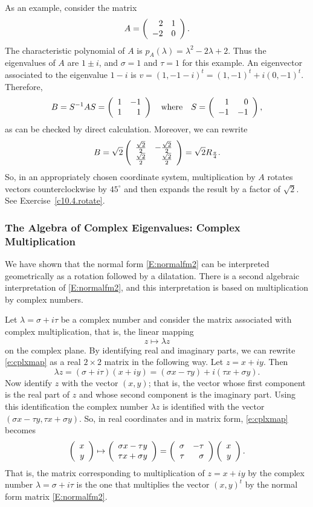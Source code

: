 \documentclass{ximera}
\begin{document}
As an example, consider the matrix
\begin{equation}  \label{E:exampA}
A = \left(\begin{array}{rr} 2 & 1\\ -2 &0\end{array}\right).
\end{equation}
The characteristic polynomial
of $A$ is $p_A(\lambda)=\lambda^2-2\lambda+2$.
Thus the eigenvalues of $A$ are $1\pm i$, and $\sigma=1$ and $\tau=1$ for
this example.  An eigenvector associated to the eigenvalue $1-i$ is 
$v=(1,-1-i)^t=(1,-1)^t+i(0,-1)^t$. Therefore, 
\[
B = S^{-1} A S = \left(\begin{array}{rr} 1 & -1\\ 1 &1\end{array}\right) \quad\mbox{where}\quad 
S = \left(\begin{array}{rr} 1 & 0\\ -1 &-1\end{array}\right),
\]
as can be checked by direct calculation.  Moreover, we can rewrite
\[
B = \sqrt{2}\left(\begin{array}{rr} \frac{\sqrt{2}}{2} & -\frac{\sqrt{2}}{2}\\ \frac{\sqrt{2}}{2} &\frac{\sqrt{2}}{2}\end{array}\right) =
\sqrt{2}R_{\frac{\pi}{4}}.
\]
So, in an appropriately chosen coordinate system, multiplication by $A$ rotates
vectors counterclockwise by $45^\circ$ and then expands the result by a 
factor of $\sqrt{2}$.  See Exercise~\ref{c10.4.rotate}.

\subsubsection*{The Algebra of Complex Eigenvalues: Complex Multiplication}

We have shown that the normal form \eqref{E:normalfm2} can 
be interpreted geometrically as a rotation followed by a dilatation.  There 
is a second algebraic interpretation of \eqref{E:normalfm2}, and this 
interpretation is based on multiplication by complex numbers.

Let $\lambda=\sigma+i\tau$ be a complex number and consider the matrix 
associated with complex multiplication, that is, the linear mapping
\begin{equation}  \label{e:cplxmap}
z\mapsto \lambda z
\end{equation}
on the complex plane.  By identifying real and imaginary parts, we can 
rewrite \eqref{e:cplxmap} as a real $2\times 2$ matrix in the following way. 
Let $z=x + iy$.  Then
\[
\lambda z = (\sigma+i\tau)(x+iy) = (\sigma x - \tau y) + 
i(\tau x + \sigma y).
\]
Now identify $z$ with the vector $(x,y)$; that is, the vector whose first
component is the real part of $z$ and whose second component is the 
imaginary part.  Using this identification the complex number $\lambda z$
is identified with the vector $(\sigma x - \tau y,\tau x + \sigma y)$. 
So, in real coordinates and in matrix form, \eqref{e:cplxmap} becomes
\[
\left(\begin{array}{r} x \\ y\end{array}\right)\mapsto \left(\begin{array}{r} \sigma x - \tau y \\ \tau x + \sigma y\end{array}\right) =
\left(\begin{array}{rr} \sigma & -\tau\\ \tau &\sigma\end{array}\right) \left(\begin{array}{r} x \\ y\end{array}\right).
\]
That is, the matrix corresponding to multiplication of $z=x+iy$ by the 
complex number $\lambda=\sigma+i\tau$ is the one that multiplies the 
vector $(x,y)^t$ by the normal form matrix \eqref{E:normalfm2}.
\end{document}
